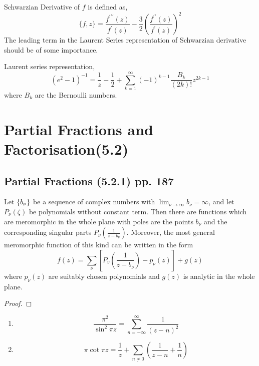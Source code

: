 \begin{definition}
	Schwarzian Derivative of $f$ is defined as,
	\[ \{f,z\} = \frac{f^{\prime\prime\prime}(z)}{f^\prime(z)} - \frac{3}{2} \left(\frac{f^{\prime\prime}(z)}{f^\prime(z)}\right)^2 \]
	The leading term in the Laurent Series representation of Schwarzian derivative should be of some importance.
\end{definition}

\begin{remark}
	Laurent series representation,
	\[ (e^2-1)^{-1} = \frac{1}{z} - \frac{1}{2} + \sum_{k=1}^\infty (-1)^{k-1}\frac{B_k}{(2k)!} z^{2k-1} \]
	where $B_k$ are the Bernoulli numbers.
\end{remark}
\section{Partial Fractions and Factorisation(5.2)}
\subsection{Partial Fractions (5.2.1) pp. 187}
\begin{theorem}
	Let $\left\{b_\nu\right\}$ be a sequence of complex numbers with $\displaystyle \lim_{\nu \to \infty} b_\nu = \infty$, and let $P_\nu(\zeta)$ be polynomials without constant term. Then there are functions which are meromorphic in the whole plane with poles are the points $b_\nu$ and the corresponding singular parts $P_\nu(\frac{1}{z-b_\nu})$. Moreover, the most general meromorphic function of this kind can be written in the form
	\begin{equation}
		f(z) = \sum_\nu \left[ P_v\left(\frac{1}{z-b_\nu}\right) - p_\nu(z) \right] + g(z)
	\end{equation}
	where $p_\nu(z)$ are suitably chosen polynomials and $g(z)$ is analytic in the whole plane.
\end{theorem}
\begin{proof}
\end{proof}

\begin{remark}
	\begin{enumerate}
		\item \[ \frac{\pi^2}{\sin^2 \pi z} = \sum_{n=-\infty}^\infty \frac{1}{(z-n)^2} \]
		\item \[ \pi \cot \pi z = \frac{1}{z} + \sum_{n \ne 0} \left(\frac{1}{z-n} + \frac{1}{n} \right) \]
	\end{enumerate}
\end{remark}

